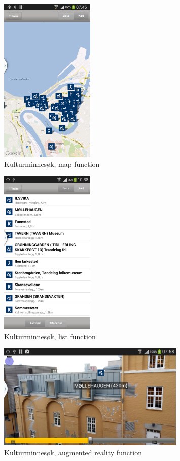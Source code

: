 \documentclass[11pt]{book}
\begin{document}
\begin{figure}[H]
      \centering
      \includegraphics[width=0.4\textwidth]{Figures/Prestudy/kulturSokMap.png}
      \caption{Kulturminnesøk, map function}
      \label{fig:pre_kulturMinneAppMap}
\end{figure}

\begin{figure}[H]
      \centering
      \includegraphics[width=0.4\textwidth]{Figures/Prestudy/kulturSokList.png}
      \caption{Kulturminnesøk, list function}
      \label{fig:pre_kulturMinneAppList}
\end{figure}

\begin{figure}[H]
      \centering
      \includegraphics[width=0.8\textwidth]{Figures/Prestudy/kulturSokAR1.png}
      \caption{Kulturminnesøk, augmented reality function}
      \label{fig:pre_kulturMinneAppAug}
\end{figure}
\end{document}
